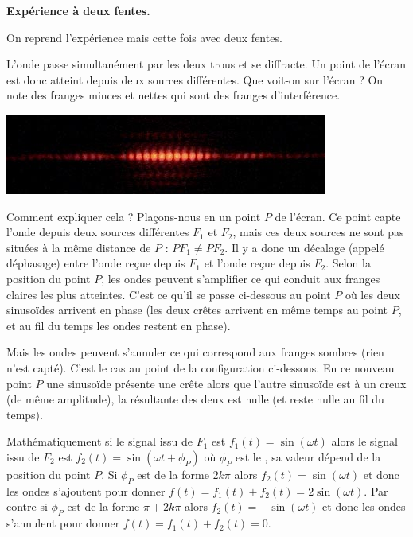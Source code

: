 \documentclass[11pt,class=report,crop=false]{standalone}
\begin{document}
\textbf{Expérience à deux fentes.}

On reprend l'expérience mais cette fois avec deux fentes.


 L'onde passe simultanément par les deux trous et se diffracte. Un point de l'écran est donc atteint depuis deux sources différentes. Que voit-on sur l'écran ? On note des franges minces et nettes qui sont des franges d'interférence. 

\begin{center}
\includegraphics[scale=\myscale,scale=0.9]{figures/fig-deux-fentes}
\end{center}

Comment expliquer cela ? Plaçons-nous en un point $P$ de l'écran. Ce point capte l'onde depuis deux sources différentes $F_1$ et $F_2$, mais ces deux sources ne sont pas situées à la même distance de $P$ : $PF_1 \neq PF_2$. Il y a donc un décalage (appelé déphasage) entre l'onde reçue depuis $F_1$ et l'onde reçue depuis $F_2$. Selon la position du point $P$, les ondes peuvent s'amplifier ce qui conduit aux franges claires les plus atteintes.
C'est ce qu'il se passe ci-dessous au point $P$ où les deux sinusoïdes arrivent en phase (les deux crêtes arrivent en même temps au point $P$, et au fil du temps les ondes restent en phase).


Mais les ondes peuvent s'annuler ce qui correspond aux franges sombres (rien n'est capté). C'est le cas au point de la configuration ci-dessous. En ce nouveau point $P$ une sinusoïde  présente une crête alors que l'autre sinusoïde est à un creux (de même amplitude), la résultante des deux est nulle (et reste nulle au fil du temps).



Mathématiquement si le signal issu de $F_1$ est $f_1(t) = \sin(\omega t)$
alors le signal issu de $F_2$ est $f_2(t) = \sin(\omega t + \phi_P)$ où $\phi_P$ est le , sa valeur dépend de la position du point $P$.
Si $\phi_P$ est de la forme $2k\pi$ alors $f_2(t) = \sin(\omega t)$ et donc les ondes s'ajoutent pour donner $f(t) = f_1(t)+f_2(t) = 2\sin(\omega t)$.
Par contre si $\phi_P$ est de la forme $\pi + 2k\pi$ alors $f_2(t) = -\sin(\omega t)$ et donc les ondes s'annulent pour donner $f(t) = f_1(t)+f_2(t) = 0$.
\end{document}
